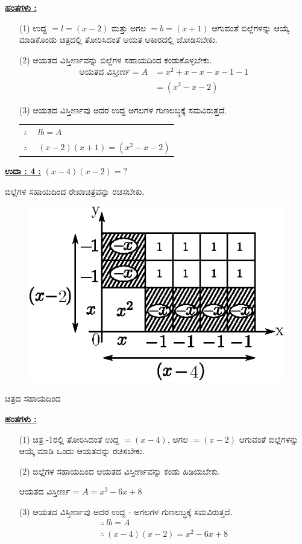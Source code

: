 \noindent
{\textbf{\underline{ಹಂತಗಳು :}}}
\begin{itemize}
\item [(1)] ಉದ್ದ $= l = (x - 2)$ ಮತ್ತು ಅಗಲ $= b = (x + 1)$ ಆಗುವಂತೆ ಬಿಲ್ಲೆಗಳನ್ನು ಆಯ್ಕೆ ಮಾಡಿಕೊಂಡು ಚಿತ್ರದಲ್ಲಿ ತೋರಿಸಿದಂತೆ ಆಯತ ಆಕಾರದಲ್ಲಿ ಜೋಡಿಸಬೇಕು. 
\item [(2)] ಆಯತದ ವಿಸ್ತೀರ್ಣವನ್ನು ಬಿಲ್ಲೆಗಳ ಸಹಾಯದಿಂದ ಕಂಡುಕೊಳ್ಳಬೇಕು. 
\begin{align*}
\text{ಆಯತದ ವಿಸ್ತೀರ್ಣ}= A & = x^2 + x - x - x - 1 - 1\\
& = (x^2 - x - 2)
\end{align*}
\item [(3)] ಆಯತದ ವಿಸ್ತೀರ್ಣವು ಅದರ ಉದ್ದ ಅಗಲಗಳ ಗುಣಲಬ್ಧಕ್ಕೆ ಸಮವಿರುತ್ತದೆ.
\begin{tabular}{ll}
$\therefore~$ & $lb = A$\\
$\therefore~$ & $(x-2)(x+1) = (x^2-x-2)$
\end{tabular}

\end{itemize}

\medskip
\noindent
{\textbf{\underline{ಉದಾ : 4 :}}} $(x-4)(x-2) = ?$

ಬಿಲ್ಲೆಗಳ ಸಹಾಯದಿಂದ ರೇಖಾಚಿತ್ರವನ್ನು ರಚಿಸಬೇಕು.
\begin{figure}[H]
\centering
\includegraphics[scale=0.8]{src/figure/chap3/fig3-31d.eps}
\end{figure}
ಚಿತ್ರದ ಸಹಾಯದಿಂದ

\noindent
{\textbf{\underline{ಹಂತಗಳು :}}}
\begin{itemize}
\item [(1)] ಚಿತ್ರ -1ರಲ್ಲಿ ತೋರಿಸಿದಂತೆ ಉದ್ದ $= (x-4)$, ಅಗಲ $= (x-2)$ ಆಗುವಂತೆ ಬಿಲ್ಲೆಗಳನ್ನು  ಆಯ್ಕೆ ಮಾಡಿ ಒಂದು ಆಯತವನ್ನು ರಚಿಸಬೇಕು. 
\item [(2)] ಬಿಲ್ಲೆಗಳ ಸಹಾಯದಿಂದ ಆಯತದ ವಿಸ್ತೀರ್ಣವನ್ನು ಕಂಡು ಹಿಡಿಯಬೇಕು. 

ಆಯತದ ವಿಸ್ತೀರ್ಣ = $A = x^2 - 6x + 8$
\item [(3)] ಆಯತದ ವಿಸ್ತೀರ್ಣವು ಅದರ ಉದ್ದ - ಅಗಲಗಳ ಗುಣಲಬ್ಧಕ್ಕೆ ಸಮವಿರುತ್ತದೆ. 
\begin{gather*}
\therefore~ lb = A\\
\therefore~ (x-4)(x-2) = x^2 - 6x + 8
\end{gather*}
\end{itemize}

